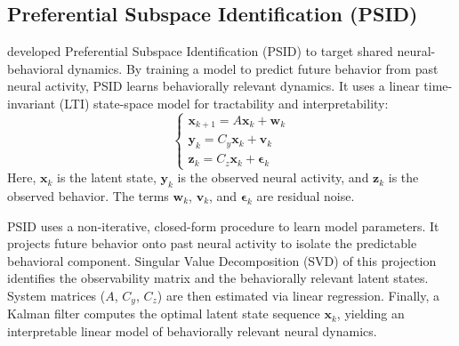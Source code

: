 \documentclass[12pt, a4paper]{article}
\begin{document}
\subsection{Preferential Subspace Identification (PSID)}
\textcite{saniModelingBehaviorallyRelevant2021} developed Preferential Subspace Identification (PSID) to target shared neural-behavioral dynamics. By training a model to predict future behavior from past neural activity, PSID learns behaviorally relevant dynamics. It uses a linear time-invariant (LTI) state-space model for tractability and interpretability:
\[
    \begin{cases}
        \mathbf{x}_{k+1} = A \mathbf{x}_k + \mathbf{w}_k \\
        \mathbf{y}_k = C_y \mathbf{x}_k + \mathbf{v}_k   \\
        \mathbf{z}_k = C_z \mathbf{x}_k + \boldsymbol{\epsilon}_k
    \end{cases}
\]
Here, $\mathbf{x}_k$ is the latent state, $\mathbf{y}_k$ is the observed neural activity, and $\mathbf{z}_k$ is the observed behavior. The terms $\mathbf{w}_k$, $\mathbf{v}_k$, and $\boldsymbol{\epsilon}_k$ are residual noise.

PSID uses a non-iterative, closed-form procedure to learn model parameters. It projects future behavior onto past neural activity to isolate the predictable behavioral component. Singular Value Decomposition (SVD) of this projection identifies the observability matrix and the behaviorally relevant latent states. System matrices ($A$, $C_y$, $C_z$) are then estimated via linear regression. Finally, a Kalman filter computes the optimal latent state sequence $\mathbf{x}_k$, yielding an interpretable linear model of behaviorally relevant neural dynamics.
\end{document}
